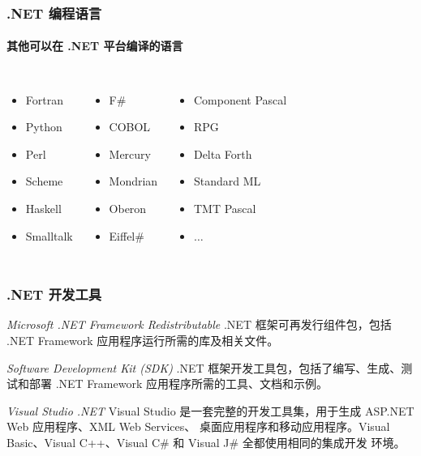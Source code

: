 \begin{frame}
\frametitle{.NET 编程语言}
\framesubtitle{其他可以在 .NET 平台编译的语言 }
\begin{columns}[t]
  \begin{itemize}
    \setlength{\itemsep}{8pt plus 1pt}
  \item Fortran
  \item Python
  \item Perl
  \item Scheme
  \item Haskell
  \item Smalltalk
  \end{itemize}
  \begin{itemize}
    \setlength{\itemsep}{8pt plus 1pt}
  \item F\#
  \item COBOL
  \item Mercury
  \item Mondrian
  \item Oberon
  \item Eiffel\#
  \end{itemize}
  \begin{itemize}
    \setlength{\itemsep}{8pt plus 1pt}
  \item Component Pascal
  \item RPG
  \item Delta Forth
  \item Standard ML
  \item TMT Pascal
  \item $\ldots$
  \end{itemize}
\end{columns}
\end{frame}


\begin{frame}
\frametitle{.NET 开发工具}

\begin{exampleblock}{\textit{Microsoft .NET Framework Redistributable}}
  \CJKindent .NET 框架可再发行组件包，包括 .NET Framework 应用程序运行所需的库及相关文件。
\end{exampleblock}
\pause
\begin{exampleblock}{\textit{Software Development Kit (SDK)}}
  \CJKindent .NET 框架开发工具包，包括了编写、生成、测试和部署 .NET Framework 应用程序所需的工具、文档和示例。
\end{exampleblock}
\pause
\begin{block}{\textit{Visual Studio .NET}}
  \CJKindent Visual Studio 是一套完整的开发工具集，用于生成 ASP.NET Web 应用程序、XML Web Services、
  桌面应用程序和移动应用程序。Visual Basic、Visual C++、Visual C\# 和 Visual J\# 全都使用相同的集成开发
  环境。
\end{block}

\end{frame}

